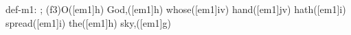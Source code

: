 def-m1: \grealign;
(f3)O([em1]h) God,([em1]h) whose([em1]iv) hand([em1]jv) hath([em1]i) spread([em1]i) the([em1]h) sky,([em1]g)